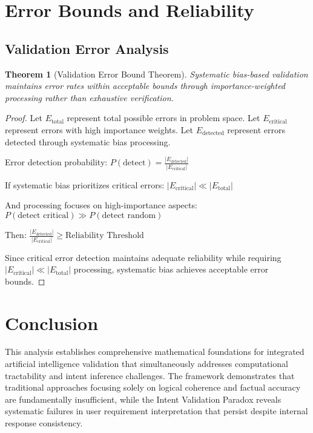 \documentclass[12pt,a4paper]{article}
\newtheorem{theorem}{Theorem}
\begin{document}
\section{Error Bounds and Reliability}

\subsection{Validation Error Analysis}

\begin{theorem}[Validation Error Bound Theorem]
Systematic bias-based validation maintains error rates within acceptable bounds through importance-weighted processing rather than exhaustive verification.
\end{theorem}

\begin{proof}
Let $E_{\text{total}}$ represent total possible errors in problem space.
Let $E_{\text{critical}}$ represent errors with high importance weights.
Let $E_{\text{detected}}$ represent errors detected through systematic bias processing.

Error detection probability: $P(\text{detect}) = \frac{|E_{\text{detected}}|}{|E_{\text{critical}}|}$

If systematic bias prioritizes critical errors: $|E_{\text{critical}}| \ll |E_{\text{total}}|$

And processing focuses on high-importance aspects: $P(\text{detect critical}) \gg P(\text{detect random})$

Then: $\frac{|E_{\text{detected}}|}{|E_{\text{critical}}|} \geq \text{Reliability Threshold}$

Since critical error detection maintains adequate reliability while requiring $|E_{\text{critical}}| \ll |E_{\text{total}}|$ processing, systematic bias achieves acceptable error bounds.
\end{proof}

\section{Conclusion}

This analysis establishes comprehensive mathematical foundations for integrated artificial intelligence validation that simultaneously addresses computational tractability and intent inference challenges. The framework demonstrates that traditional approaches focusing solely on logical coherence and factual accuracy are fundamentally insufficient, while the Intent Validation Paradox reveals systematic failures in user requirement interpretation that persist despite internal response consistency.
\end{document}

